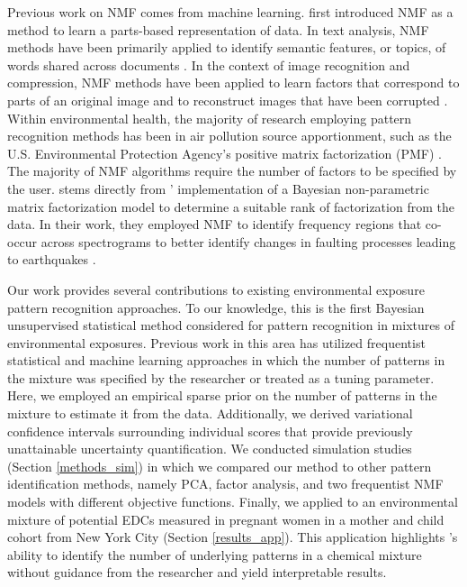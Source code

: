 Previous work on NMF comes from machine learning. \citet{lee1999learning} first introduced NMF as a method to learn a parts-based representation of data. In text analysis, NMF methods have been primarily applied to identify semantic features, or topics, of words shared across documents \citep{blei2003latent, paisley2014bayesian}. In the context of image recognition and compression, NMF methods have been applied to learn factors that correspond to parts of an original image and to reconstruct images that have been corrupted \citep{sandler2011nonnegative, cemgil2008bayesian}. Within environmental health, the majority of research employing pattern recognition methods has been in air pollution source apportionment, such as the U.S. Environmental Protection Agency's positive matrix factorization (PMF) \citep{paatero94}. The majority of NMF algorithms require the number of factors to be specified by the user. \bnmf stems directly from \citeauthor{holtzman2018machine}' implementation of a Bayesian non-parametric matrix factorization model to determine a suitable rank of factorization from the data. In their work, they employed NMF to identify frequency regions that co-occur across spectrograms to better identify changes in faulting processes leading to earthquakes \citep{holtzman2018machine}.

Our work provides several contributions to existing environmental exposure pattern recognition approaches. To our knowledge, this is the first Bayesian unsupervised statistical method considered for pattern recognition in mixtures of environmental exposures. Previous work in this area has utilized frequentist statistical and machine learning approaches in which the number of patterns in the mixture was specified by the researcher or treated as a tuning parameter. Here, we employed an empirical sparse prior on the number of patterns in the mixture to estimate it from the data. Additionally, we derived variational confidence intervals surrounding individual scores that provide previously unattainable uncertainty quantification. We conducted simulation studies (Section \ref{methods_sim}) in which we compared our method to other pattern identification methods, namely PCA, factor analysis, and two frequentist NMF models with different objective functions. Finally, we applied \bnmf to an environmental mixture of potential EDCs measured in pregnant women in a mother and child cohort from New York City (Section \ref{results_app}). This application highlights \bnmfc's ability to identify the number of underlying patterns in a chemical mixture without guidance from the researcher and yield interpretable results.

